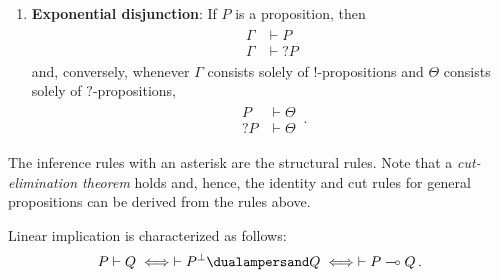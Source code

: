\begin{enumerate}
        \item\textbf{Exponential disjunction}: If $P$ is a proposition, then
            \begin{gather}
                \begin{aligned}
                    \Gamma&\vdash P\\
                    \hline
                    \Gamma&\vdash?P
                \end{aligned}
            \end{gather}
            and, conversely, whenever $\Gamma$ consists solely of $!$-propositions and $\Theta$ consists solely of $?$-propositions,
            \begin{gather}
                \begin{aligned}
                    P&\vdash\Theta\\
                    \hline
                    ?P&\vdash\Theta
                \end{aligned}\,.
            \end{gather}
    \end{enumerate}
    The inference rules with an asterisk are the structural rules. Note that a \textit{cut-elimination theorem} holds and, hence, the identity and cut rules for general propositions can be derived from the rules above.

    Linear implication is characterized as follows:
    \begin{gather}
        P\vdash Q \iff \vdash P^\perp\dualampersand Q \iff \vdash P\multimap Q\,.
    \end{gather}


